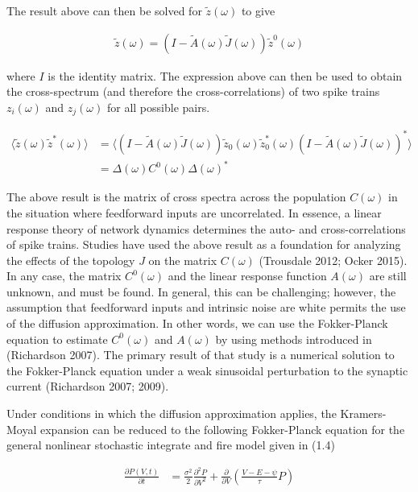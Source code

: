 \documentclass{ucetd}
\begin{document}
The result above can then be solved for $\tilde{z}(\omega)$ to give 


\begin{align}
\tilde{z}(\omega) = \left(I-\tilde{A}(\omega)\tilde{J}(\omega)\right)\tilde{z}^{0}(\omega)
\end{align}

where $I$ is the identity matrix. The expression above can then be used to obtain the cross-spectrum (and therefore the cross-correlations) of two spike trains $z_{i}(\omega)$ and $z_{j}(\omega)$ for all possible pairs. 

\begin{align}
\langle\tilde{z}(\omega)\tilde{z}^{*}(\omega)\rangle &= \langle \left(I-\tilde{A}(\omega)\tilde{J}(\omega)\right)\tilde{z}_{0}(\omega)\tilde{z}_{0}^{*}(\omega)\left(I-\tilde{A}(\omega)\tilde{J}(\omega)\right)^{*}\rangle\\
&= \Delta(\omega)C^{0}(\omega)\Delta(\omega)^{*}
\end{align}

The above result is the matrix of cross spectra across the population $C(\omega)$ in the situation where feedforward inputs are uncorrelated.
In essence, a linear response theory of network dynamics determines the auto- and cross-correlations of spike trains. Studies have used the above result as a foundation for analyzing the effects of the topology $J$ on the matrix $C(\omega)$ (Trousdale 2012; Ocker 2015). In any case, the matrix $C^{0}(\omega)$ and the linear response function $A(\omega)$ are still unknown, and must be found. In general, this can be challenging; however, the assumption that feedforward inputs and intrinsic noise are white permits the use of the diffusion approximation. In other words, we can use the Fokker-Planck equation to estimate $C^{0}(\omega)$ and $A(\omega)$ by using methods introduced in (Richardson 2007). The primary result of that study is a numerical solution to the Fokker-Planck equation under a weak sinusoidal perturbation to the synaptic current (Richardson 2007; 2009). 

Under conditions in which the diffusion approximation applies, the Kramers-Moyal expansion can be reduced to the following Fokker-Planck equation for the general nonlinear stochastic integrate and fire model given in (1.4)

\begin{align}
\frac{\partial P(V,t)}{\partial t} &= \frac{\sigma^{2}}{2}\frac{\partial^{2}P}{\partial V^{2}} + \frac{\partial}{\partial V}\left(\frac{V-E-\psi}{\tau}P\right)
\end{align}
\end{document}
